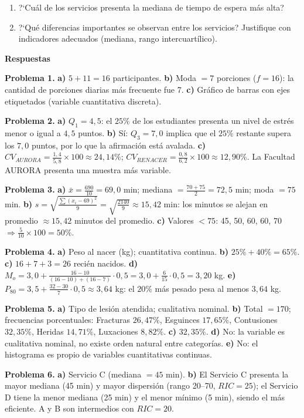 \documentclass[10pt,letterpaper]{article}
\newcommand{\seccion}[1]{%
  \vspace{2pt}%
  \begin{tcolorbox}[enhanced,colback=white,colframe=black,arc=0pt,boxrule=0pt,
    leftrule=2pt,left=6pt,right=6pt,top=1pt,bottom=1pt]
    {\normalsize\bfseries\sffamily #1}
  \end{tcolorbox}%
  \vspace{1pt}%
}
\begin{document}
\begin{enumerate}[leftmargin=1.2cm, label=\textbf{\alph*)}, itemsep=2pt, topsep=2pt]
  \item ?`Cu\'al de los servicios presenta la mediana de tiempo de espera m\'as alta?
  \item ?`Qu\'e diferencias importantes se observan entre los servicios? Justifique con indicadores adecuados (mediana, rango intercuart\'ilico).
\end{enumerate}

\newpage

\seccion{Respuestas}

\small\sffamily
\textbf{Problema 1.}
\textbf{a)} $5+11=16$ participantes.
\textbf{b)} Moda $=7$ porciones ($f=16$): la cantidad de porciones diarias m\'as frecuente fue 7.
\textbf{c)} Gr\'afico de barras con ejes etiquetados (variable cuantitativa discreta).

\medskip
\textbf{Problema 2.}
\textbf{a)} $Q_1=4{,}5$: el $25\%$ de los estudiantes presenta un nivel de estr\'es menor o igual a $4{,}5$ puntos.
\textbf{b)} S\'i: $Q_3=7{,}0$ implica que el $25\%$ restante supera los $7{,}0$ puntos, por lo que la afirmaci\'on est\'a avalada.
\textbf{c)} $CV_{AURORA}=\frac{1{,}4}{5{,}8}\times100\approx 24{,}14\%$; $CV_{RENACER}=\frac{0{,}8}{6{,}2}\times100\approx12{,}90\%$. La Facultad AURORA presenta una muestra m\'as variable.

\medskip
\textbf{Problema 3.}
\textbf{a)} $\bar{x}=\frac{690}{10}=69{,}0$ min; mediana $=\frac{70+75}{2}=72{,}5$ min; moda $=75$ min.
\textbf{b)} $s=\sqrt{\frac{\sum(x_i-69)^2}{9}}=\sqrt{\frac{2140}{9}}\approx 15{,}42$ min: los minutos se alejan en promedio $\approx15{,}42$ minutos del promedio.
\textbf{c)} Valores $<75$: 45, 50, 60, 60, 70 $\Rightarrow \frac{5}{10}\times100=50\%$.

\medskip
\textbf{Problema 4.}
\textbf{a)} Peso al nacer (kg); cuantitativa continua.
\textbf{b)} $25\%+40\%=65\%$.
\textbf{c)} $16+7+3=26$ reci\'en nacidos.
\textbf{d)} $M_o = 3{,}0+\frac{16-10}{(16-10)+(16-7)}\cdot0{,}5 = 3{,}0+\frac{6}{15}\cdot0{,}5 = 3{,}20$ kg.
\textbf{e)} $P_{80}=3{,}5+\frac{32-30}{7}\cdot0{,}5\approx 3{,}64$ kg: el $20\%$ m\'as pesado pesa al menos $3{,}64$ kg.

\medskip
\textbf{Problema 5.}
\textbf{a)} Tipo de lesi\'on atendida; cualitativa nominal.
\textbf{b)} Total $=170$; frecuencias porcentuales: Fracturas $26{,}47\%$, Esguinces $17{,}65\%$, Contusiones $32{,}35\%$, Heridas $14{,}71\%$, Luxaciones $8{,}82\%$.
\textbf{c)} $32{,}35\%$.
\textbf{d)} No: la variable es cualitativa nominal, no existe orden natural entre categor\'ias.
\textbf{e)} No: el histograma es propio de variables cuantitativas continuas.

\medskip
\textbf{Problema 6.}
\textbf{a)} Servicio C (mediana $=45$ min).
\textbf{b)} El Servicio C presenta la mayor mediana (45 min) y mayor dispersi\'on (rango 20--70, $RIC=25$); el Servicio D tiene la menor mediana (25 min) y el menor m\'inimo (5 min), siendo el m\'as eficiente. A y B son intermedios con $RIC=20$.
\end{document}
